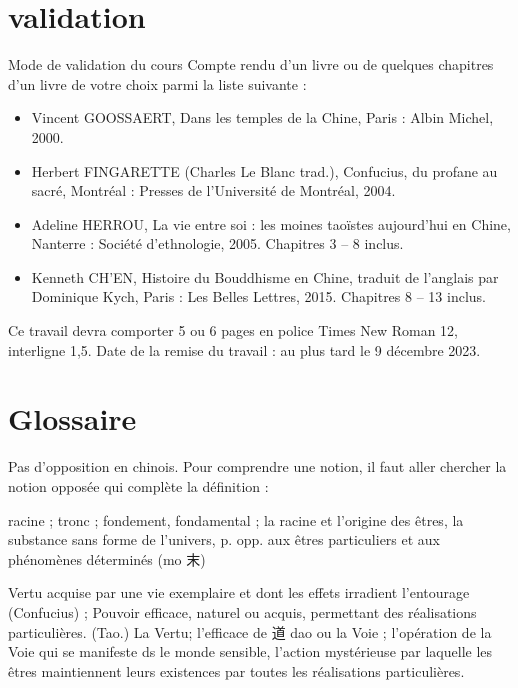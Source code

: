 \section{validation}
Mode de validation du cours   Compte rendu d’un livre ou de quelques chapitres d’un livre de votre choix parmi la liste suivante :  
\begin{itemize}

\item  Vincent GOOSSAERT, Dans les temples de la Chine, Paris : Albin Michel, 2000.  \item  Herbert FINGARETTE (Charles Le Blanc trad.), Confucius, du profane au sacré, Montréal : Presses de l’Université de Montréal, 2004.  \item  Adeline HERROU, La vie entre soi : les moines taoïstes aujourd’hui en Chine, Nanterre : Société d’ethnologie, 2005. Chapitres 3 – 8 inclus.  \item  Kenneth CH’EN, Histoire du Bouddhisme en Chine, traduit de l’anglais par Dominique Kych, Paris : Les Belles Lettres, 2015. Chapitres 8 – 13 inclus.   

\end{itemize}

Ce travail devra comporter 5 ou 6 pages en police Times New Roman 12, interligne 1,5.   Date de la remise du travail : au plus tard le 9 décembre 2023. 




\section{Glossaire}


Pas d'opposition en chinois. Pour comprendre une notion, il faut aller chercher la notion opposée qui complète la définition : \label{DefGlossaire}


\begin{Def}[ben 本]
    racine ; tronc ; fondement, fondamental ; la racine et l’origine des êtres, la substance sans forme de l’univers, p. opp. aux êtres particuliers et aux phénomènes déterminés (mo 末) 
\end{Def}



\begin{Def}[de 德]
    Vertu acquise par une vie exemplaire et dont les effets irradient l’entourage (Confucius) ; Pouvoir efficace, naturel ou acquis, permettant des réalisations particulières.     (Tao.) La Vertu; l’efficace de 道 dao ou la Voie ; l’opération de la Voie qui se manifeste ds le monde sensible, l’action mystérieuse par laquelle les êtres maintiennent leurs existences par toutes les réalisations particulières.
\end{Def}

